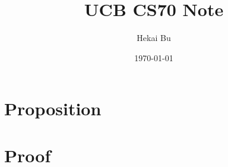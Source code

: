 \documentclass[10pt, oneside]{article}
\title{UCB CS70 Note}
\author{Hekai Bu}
\date{\today}
\begin{document}
\maketitle
\tableofcontents

\section{Proposition}

\section{Proof}
\end{document}
